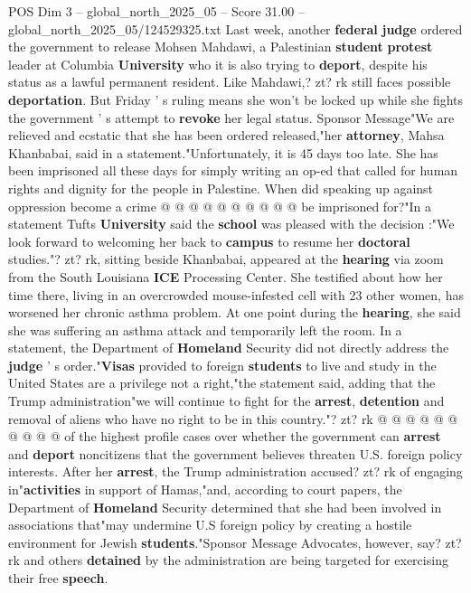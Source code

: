 \begin{textsample}{POS Dim 3 – global\_north\_2025\_05 – Score 31.00 – global\_north\_2025\_05/124529325.txt}
Last week, another \textbf{federal} \textbf{judge} ordered the government to release Mohsen Mahdawi, a Palestinian \textbf{student} \textbf{protest} leader at Columbia \textbf{University} who it is also trying to \textbf{deport}, despite his status as a lawful permanent resident.
Like Mahdawi,? zt? rk still faces possible \textbf{deportation}.
But Friday ' s ruling means she won't be locked up while she fights the government ' s attempt to \textbf{revoke} her legal status.
Sponsor Message"We are relieved and ecstatic that she has been ordered released,"her \textbf{attorney}, Mahsa Khanbabai, said in a statement."Unfortunately, it is 45 days too late.
She has been imprisoned all these days for simply writing an op-ed that called for human rights and dignity for the people in Palestine.
When did speaking up against oppression become a crime @ @ @ @ @ @ @ @ @ @ be imprisoned for?"In a statement Tufts \textbf{University} said the \textbf{school} was pleased with the decision :"We look forward to welcoming her back to \textbf{campus} to resume her \textbf{doctoral} studies."? zt? rk, sitting beside Khanbabai, appeared at the \textbf{hearing} via zoom from the South Louisiana \textbf{ICE} Processing Center.
She testified about how her time there, living in an overcrowded mouse-infested cell with 23 other women, has worsened her chronic asthma problem.
At one point during the \textbf{hearing}, she said she was suffering an asthma attack and temporarily left the room.
In a statement, the Department of \textbf{Homeland} Security did not directly address the \textbf{judge} ' s order."\textbf{Visas} provided to foreign \textbf{students} to live and study in the United States are a privilege not a right,"the statement said, adding that the Trump administration"we will continue to fight for the \textbf{arrest}, \textbf{detention} and removal of aliens who have no right to be in this country."? zt? rk @ @ @ @ @ @ @ @ @ @ of the highest profile cases over whether the government can \textbf{arrest} and \textbf{deport} noncitizens that the government believes threaten U.S. foreign policy interests.
After her \textbf{arrest}, the Trump administration accused? zt? rk of engaging in"\textbf{activities} in support of Hamas,"and, according to court papers, the Department of \textbf{Homeland} Security determined that she had been involved in associations that"may undermine U.S foreign policy by creating a hostile environment for Jewish \textbf{students}."Sponsor Message Advocates, however, say? zt? rk and others \textbf{detained} by the administration are being targeted for exercising their free \textbf{speech}.

\end{textsample}
